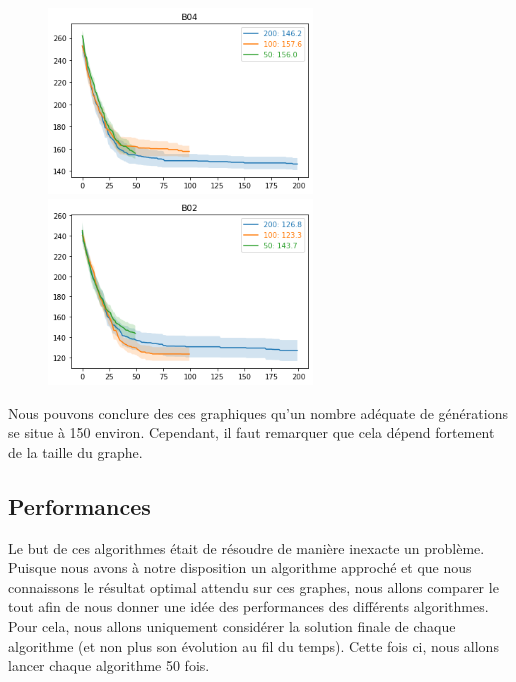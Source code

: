 \documentclass{article}
\begin{document}
\begin{figure}[H]
	\centerline{ \includegraphics[width=7cm]{images/B04gen.png} \includegraphics[width=7cm]{images/B02gen.png} } 
\end{figure}

Nous pouvons conclure des ces graphiques qu'un nombre adéquate de générations se situe à 150 environ. Cependant, il faut remarquer que cela dépend fortement de la taille du graphe.

\subsection{Performances}
Le but de ces algorithmes était de résoudre de manière inexacte un problème. Puisque nous avons à notre disposition un algorithme approché et que nous connaissons le résultat optimal attendu sur ces graphes, nous allons comparer le tout afin de nous donner une idée des performances des différents algorithmes. Pour cela, nous allons uniquement considérer la solution finale de chaque algorithme (et non plus son évolution au fil du temps). Cette fois ci, nous allons lancer chaque algorithme 50 fois.
\end{document}
